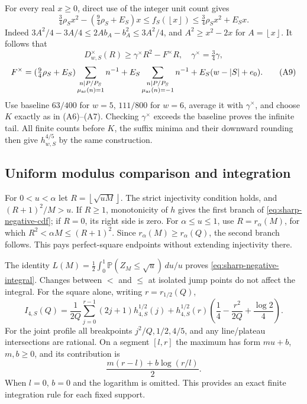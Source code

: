 \documentclass[11pt]{article}
\theoremstyle{definition}\newtheorem{definition}[theorem]{Definition}
\theoremstyle{remark}\newtheorem{remark}[theorem]{Remark}
\newcommand{\Prb}{\mathbb P}
\newcommand{\floor}[1]{\left\lfloor #1\right\rfloor}
\begin{document}
For every real \(x\ge0\), direct use of the integer unit count gives
\[
 \tfrac34\rho_Sx^2-(\tfrac94\rho_S+E_S)x
 \le f_S(\floor x)\le\tfrac34\rho_Sx^2+E_Sx .
\]
Indeed \(3A^2/4-3A/4\le2Ab_A-b_A^2\le3A^2/4\), and
\(A^2\ge x^2-2x\) for \(A=\floor x\).
It follows that
\[
 D^\times_{w,S}(R)\ge\gamma^\times R^2-F^\times R,\quad
 \gamma^\times=\tfrac34\gamma,
\]
\[
 F^\times=
 (\tfrac94\rho_S+E_S)\sum_{\substack{n\mid P/P_S\\\mu_{\rm ar}(n)=1}}n^{-1}
 +E_S\sum_{\substack{n\mid P/P_S\\\mu_{\rm ar}(n)=-1}}n^{-1}
 +E_S(w-|S|+e_0).                                                   \tag{A9}
\]
Use baseline \(63/400\) for \(w=5\), \(111/800\) for \(w=6\), average it
with \(\gamma^\times\), and choose \(K\) exactly as in (A6)--(A7).
Checking \(\gamma^\times\) exceeds the baseline proves the infinite tail.
All finite counts before \(K\), the suffix minima and their downward
rounding then give \(h^{4/5}_{w,S}\) by the same construction.

\subsection{Uniform modulus comparison and integration}
For \(0<u<\alpha\) let \(R=\floor{\sqrt{uM}}\).
The strict injectivity condition holds, and
\((R+1)^2/M>u\). If \(R\ge1\), monotonicity of \(h\) gives the first
branch of \eqref{eq:sharp-negative-cdf}; if \(R=0\), its right side is zero.
For \(\alpha\le u\le1\), use \(R=r_\alpha(M)\), for which
\(R^2<\alpha M\le(R+1)^2\).
Since \(r_\alpha(M)\ge r_\alpha(Q)\), the second branch follows.
This pays perfect-square endpoints without extending injectivity there.

The identity \(L(M)=\frac12\int_0^1\Prb(Z_M\le\sqrt u)\,du/u\)
proves \eqref{eq:sharp-negative-integral}. Changes between \(<\) and
\(\le\) at isolated jump points do not affect the integral.
For the square alone, writing \(r=r_{1/2}(Q)\),
\[
 I_{4,S}(Q)=\frac1{2Q}\sum_{j=0}^{r-1}(2j+1)h^{1/2}_{4,S}(j)
 +h^{1/2}_{4,S}(r)\left(\frac14-\frac{r^2}{2Q}+\frac{\log2}{4}\right).
                                                                    \tag{A10}
\]
For the joint profile all breakpoints \(j^2/Q,1/2,4/5\), and any
line/plateau intersections are rational. On a segment \([l,r]\)
the maximum has form \(mu+b\), \(m,b\ge0\), and its contribution is
\[
 \frac{m(r-l)+b\log(r/l)}2 .                                         \tag{A11}
\]
When \(l=0\), \(b=0\) and the logarithm is omitted.
This provides an exact finite integration rule for each fixed support.
\end{document}

